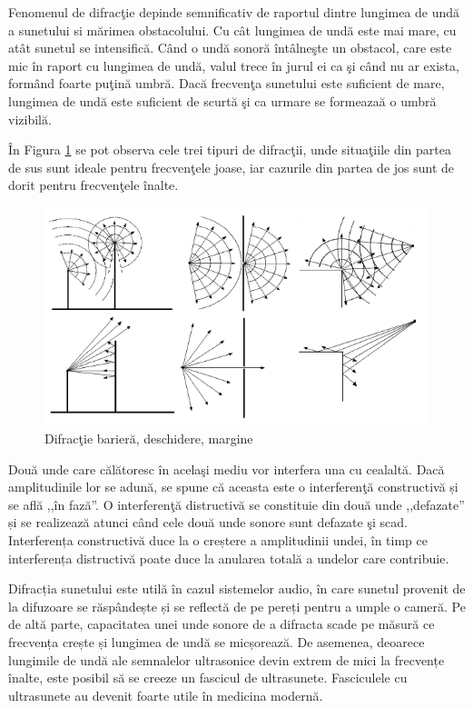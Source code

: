 	
	Fenomenul de difrac\c{t}ie depinde semnificativ de raportul dintre lungimea de und\u{a} a sunetului si m\u{a}rimea obstacolului. Cu c\^{a}t lungimea de und\u{a} este mai mare, cu at\^{a}t sunetul se intensific\u{a}. C\^{a}nd o und\u{a} sonor\u{a} \^{i}nt\^{a}lne\c{s}te un obstacol, care este mic \^{i}n raport cu lungimea de und\u{a}, valul trece \^{i}n jurul ei ca \c{s}i c\^{a}nd nu ar exista, form\^{a}nd foarte pu\c{t}in\u{a} umbr\u{a}. Dac\u{a} frecven\c{t}a sunetului este suficient de mare, lungimea de und\u{a} este suficient de scurt\u{a} \c{s}i ca urmare se formeaza\u{a} o umbr\u{a} vizibil\u{a}.
	 
	
	\^{I}n Figura \ref{Fig3} se pot observa cele trei tipuri de difrac\c{t}ii, unde situa\c{t}iile din partea de sus sunt ideale pentru frecven\c{t}ele joase, iar cazurile din partea de jos sunt de dorit pentru frecven\c{t}ele \^{i}nalte.
	 
	
	\begin{figure}[!htb]
		\centering
		\includegraphics[width=0.8\linewidth]{imagini/difractie.png}
		\caption{Difrac\c{t}ie barier\u{a}, deschidere, margine\cite{elorza}}
		\label{Fig3}
	\end{figure}
	
	Dou\u{a} unde care c\u{a}l\u{a}toresc \^{i}n acela\c{s}i mediu vor interfera una cu cealalt\u{a}. Dac\u{a} amplitudinile lor se adun\u{a}, se spune c\u{a} aceasta este o interferen\c{t}\u{a} constructiv\u{a} și se află ,,în fază''. O interferen\c{t}\u{a} distructiv\u{a} se constituie din două unde ,,defazate'' și se realizeaz\u{a} atunci c\^{a}nd cele dou\u{a} unde sonore sunt defazate \c{s}i scad. Interferența constructivă duce la o creștere a amplitudinii undei, în timp ce interferența distructivă poate duce la anularea totală a undelor care contribuie.
	 
	Difracția sunetului este utilă în cazul sistemelor audio, în care sunetul provenit de la difuzoare se răspândește și se reflectă de pe pereți pentru a umple o cameră. Pe de altă parte, capacitatea unei unde sonore de a difracta scade pe măsură ce frecvența crește și lungimea de undă se micșorează. De asemenea, deoarece lungimile de undă ale semnalelor ultrasonice devin extrem de mici la frecvențe înalte, este posibil să se creeze un fascicul de ultrasunete. Fasciculele cu ultrasunete au devenit foarte utile în medicina modernă.
	

